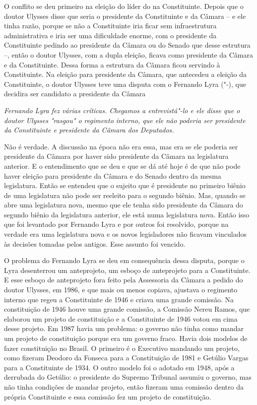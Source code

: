 O conflito se deu primeiro na eleição do líder do  na Constituinte.
Depois que o doutor Ulysses disse que seria o presidente da Constituinte
e da Câmara -- e ele tinha razão, porque se não a Constituinte iria
ficar sem infraestrutura administrativa e iria ser uma dificuldade
enorme, com o presidente da Constituinte pedindo ao presidente da Câmara
ou do Senado que desse estrutura --, então o doutor Ulysses, com a dupla
eleição, ficava como presidente da Câmara e da Constituinte. Dessa forma
a estrutura da Câmara ficou servindo à Constituinte. Na eleição para
presidente da Câmara, que antecedeu a eleição da Constituinte, o doutor
Ulysses teve uma disputa com o Fernando Lyra ("-), que decidira ser
candidato a presidente da Câmara

\medskip

\noindent\emph{Fernando Lyra fez várias críticas. Chegamos a entrevistá"-lo e
ele disse que o doutor Ulysses "rasgou" o regimento interno, que ele não
poderia ser presidente da Constituinte e presidente da Câmara dos
Deputados.}

Não é verdade. A discussão na época não era essa, mas
era se ele poderia ser presidente da Câmara por haver sido presidente da
Câmara na legislatura anterior. E o entendimento que se deu e que se dá
até hoje é de que não pode haver eleição para presidente da Câmara e do
Senado dentro da mesma legislatura. Então se entendeu que o sujeito que
é presidente no primeiro biênio de uma legislatura não pode ser reeleito
para o segundo biênio. Mas, quando se abre uma legislatura nova, mesmo
que ele tenha sido presidente da Câmara do segundo biênio da legislatura
anterior, ele está numa legislatura nova. Então isso que foi levantado
por Fernando Lyra e por outros foi resolvido, porque na verdade era uma
legislatura nova e os novos legisladores não ficavam vinculados às
decisões tomadas pelos antigos. Esse assunto foi vencido.

O problema do Fernando Lyra se deu em consequência dessa disputa, porque
o Lyra desenterrou um anteprojeto, um esboço de anteprojeto para a
Constituinte. E esse esboço de anteprojeto fora feito pela Assessoria da
Câmara a pedido do doutor Ulysses, em 1986, e que mais ou menos copiava,
ajustava o regimento interno que regeu a Constituinte de 1946 e criava
uma grande comissão. Na constituição de 1946 houve uma grande comissão,
a Comissão Nereu Ramos, que elaborou um projeto de constituição e a
Constituinte de 1946 votou em cima desse projeto. Em 1987 havia um
problema: o governo não tinha como mandar um projeto de constituição
porque era um governo fraco. Havia dois modelos de fazer constituição no
Brasil. O primeiro é o Executivo mandando um projeto, como fizeram
Deodoro da Fonseca para a Constituição de 1981 e Getúlio Vargas para a
Constituinte de 1934. O outro modelo foi o adotado em 1948, após a
derrubada do Getúlio: o presidente do Supremo Tribunal assumiu o
governo, mas não tinha condições de mandar projeto, então fizeram uma
comissão dentro da própria Constituinte e essa comissão fez um projeto
de constituição.

